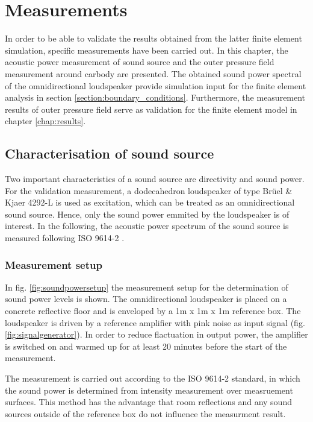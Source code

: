 \chapter{Measurements}
\label{chap:measurement}

In order to be able to validate the results obtained from the latter finite element simulation, specific measurements have been carried out. In this chapter, the acoustic power measurement of sound source and the outer pressure field measurement around carbody are presented. The obtained sound power spectral of the omnidirectional loudspeaker provide simulation input for the finite element analysis in section \ref{section:boundary_conditions}. Furthermore, the measurement results of outer pressure field serve as validation for the finite element model in chapter \ref{chap:results}.

\section{Characterisation of sound source}

Two important characteristics of a sound source are directivity and sound power. For the validation measurement, a dodecahedron loudspeaker of type Brüel \& Kjaer 4292-L is used as excitation, which can be treated as an omnidirectional sound source. Hence, only the sound power emmited by the loudspeaker is of interest. In the following, the acoustic power spectrum of the sound source is measured following ISO 9614-2 \cite{din19969614}.

\subsection*{Measurement setup}

In fig. \ref{fig:soundpowersetup} the measurement setup for the determination of sound power levels is shown. The omnidirectional loudspeaker is placed on a concrete reflective floor and is enveloped by a 1m x 1m x 1m reference box. The loudspeaker is driven by a reference amplifier with pink noise as input signal (fig. \ref{fig:signalgenerator}). In order to reduce flactuation in output power, the amplifier is switched on and warmed up for at least 20 minutes before the start of the measurement.

The measurement is carried out according to the ISO 9614-2 standard, in which the sound power is determined from intensity measurement over measruement surfaces. This method has the advantage that room reflections and any sound sources outside of the
reference box do not influence the measurment result.

